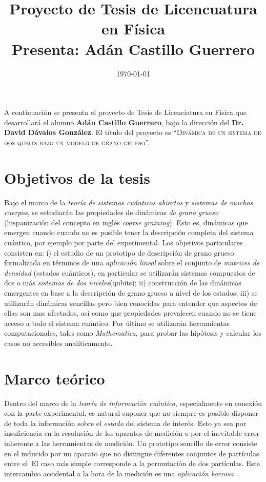 \documentclass[onecolumn,10pt]{article}
\title{Proyecto de Tesis de Licencuatura en Física\\ {\large Presenta: Adán Castillo Guerrero}}
\date{\today}
\begin{document}
\maketitle
\thispagestyle{empty}
A continuación se presenta el proyecto de Tesis de Licenciatura en Física que desarrollará el alumno \textbf{Adán Castillo Guerrero}, bajo la dirección del \textbf{Dr. David Dávalos González}. El título del proyecto es ``\textsc{Dinámica de un sistema de dos qubits bajo un modelo de grano grueso}''.

\section{Objetivos de la tesis}
Bajo el marco de la \textit{teoría de sistemas cuánticos abiertos} y \textit{sistemas de muchos cuerpos}, se estudiarán las propiedades de dinámicas \textit{de grano grueso} (hispanización del concepto en inglés \textit{coarse graining}). Esto es, dinámicas que emergen cuando cuando no es posible tener la descripción completa del sistema cuántico, por ejemplo por parte del experimental. Los objetivos particulares consisten en: i) el estudio de un prototipo de descripción de grano grueso formalizada en términos de una \textit{aplicación lineal} sobre el conjunto de \textit{matrices de densidad} (estados cuánticos), en particular se utilizarán sistemas compuestos de dos o más \textit{sistemas de dos niveles}(qubits); ii) construcción de las dinámicas emergentes en base a la descripción de grano grueso a nivel de los estados; iii) se utilizarán dinámicas sencillas pero bien conocidas para entender que aspectos de ellas son mas afectados, así como que propiedades prevalecen cuando no se tiene acceso a todo el sistema cuántico. Por último se utilizarán herramientas computacionales, tales como \textit{Mathematica}, para probar las hipótesis y calcular los casos no accesibles analíticamente.

\section{Marco teórico}


Dentro del marco de la \textit{teoría de información cuántica}, especialmente en conexión con la parte experimental, es natural suponer que no siempre es posible disponer de toda la información sobre el \textit{estado} del sistema de interés. Esto ya sea por insuficiencia en la resolución de los aparatos de medición o por el inevitable error inherente a las herramientas de medición. Un prototipo sencillo de error consiste en el inducido por un aparato que no distingue diferentes conjuntos de partículas entre sí. El caso más simple corresponde a la permutación de dos partículas. Este intercambio accidental a la hora de la medición es una \textit{aplicación borrosa}~\cite{FuzzyMeasurements}.
\end{document}
